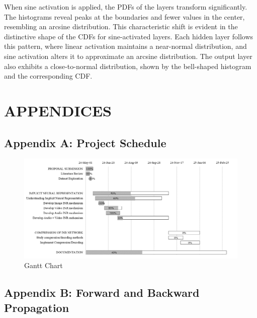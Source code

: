 \documentclass{ioereport}
\begin{document}
    When sine activation is applied, the PDFs of the layers transform significantly. The histograms reveal peaks at the boundaries and fewer values in the center, resembling an arcsine distribution. This characteristic shift is evident in the distinctive shape of the CDFs for sine-activated layers. Each hidden layer follows this pattern, where linear activation maintains a near-normal distribution, and sine activation alters it to approximate an arcsine distribution. The output layer also exhibits a close-to-normal distribution, shown by the bell-shaped histogram and the corresponding CDF. 

    \pagebreak


\section{\MakeUppercase{Appendices}}
    \subsection*{Appendix A: Project Schedule}
    \begin{figure}[H]
        \centering
        \includegraphics[angle=90, origin=c, height=0.65\textheight]{assets/Gantt.png}
        \caption{Gantt Chart}
        \label{fig:gantt}
    \end{figure}
    
\pagebreak

\subsection*{Appendix B: Forward and Backward Propagation}
\end{document}
